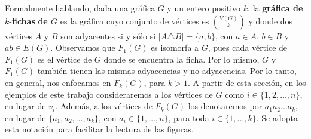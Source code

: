 Formalmente hablando, dada una gr\'afica $G$ y un entero positivo $k$, la
\textbf{gr\'afica de} $k$-\textbf{fichas} 
\textbf{de $G$} es la gr\'afica cuyo conjunto de
v\'ertices es $\binom{V(G)}{k}$ y donde dos v\'ertices $A$ y $B$ son adyacentes
si y s\'olo si $|A \triangle B| = \{a,b\}$, con $a \in A$, $b \in B$ y $ab \in
E(G)$. Observamos que $F_1(G)$ es isomorfa a $G$, pues cada v\'ertice de
$F_1(G)$ es el v\'ertice de $G$ donde se encuentra la ficha. Por lo mismo, $G$ y
$F_1(G)$ tambi\'en tienen las mismas adyacencias y no adyacencias. Por lo tanto,
en general, nos enfocamos en $F_k(G)$, para $k > 1$. A partir de esta secci\'on,
en los ejemplos de este trabajo consideraremos a los v\'ertices de $G$ como $i
\in \{1,2, \dots, n\}$, en lugar de $v_i$. Adem\'as, a los v\'ertices de
$F_k(G)$ los denotaremos por $a_1 a_2 \dots a_k$, en lugar de $\{a_1, a_2,
\dots, a_k\}$, con $a_i \in \{1, \dots, n\}$, para toda $i \in \{1, \dots, k\}$.
Se adopta esta notaci\'on para facilitar la lectura de las figuras. 

